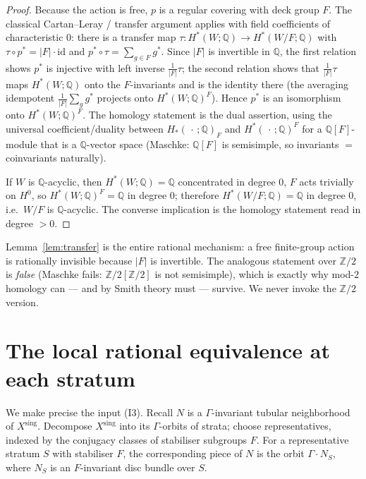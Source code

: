 \documentclass[12pt]{article}
\begin{document}
\begin{proof}
Because the action is free, $p$ is a regular covering with deck group $F$.
The classical Cartan--Leray / transfer argument applies with field
coefficients of characteristic $0$: there is a transfer map
$\tau:H^*(W;\mathbb{Q})\to H^*(W/F;\mathbb{Q})$ with
$\tau\circ p^*=|F|\cdot\mathrm{id}$ and $p^*\circ\tau=\sum_{g\in F}g^*$. Since
$|F|$ is invertible in $\mathbb{Q}$, the first relation shows $p^*$ is
injective with left inverse $\tfrac1{|F|}\tau$; the second relation shows that
$\tfrac1{|F|}\tau$ maps $H^*(W;\mathbb{Q})$ onto the $F$-invariants and is the
identity there (the averaging idempotent $\tfrac1{|F|}\sum_g g^*$ projects
onto $H^*(W;\mathbb{Q})^F$). Hence $p^*$ is an isomorphism onto
$H^*(W;\mathbb{Q})^F$. The homology statement is the dual assertion, using the
universal coefficient/duality between $H_*(\,\cdot\,;\mathbb{Q})_F$ and
$H^*(\,\cdot\,;\mathbb{Q})^F$ for a $\mathbb{Q}[F]$-module that is a
$\mathbb{Q}$-vector space (Maschke: $\mathbb{Q}[F]$ is semisimple, so
invariants $=$ coinvariants naturally).

If $W$ is $\mathbb{Q}$-acyclic, then $H^*(W;\mathbb{Q})=\mathbb{Q}$
concentrated in degree $0$, $F$ acts trivially on $H^0$, so
$H^*(W;\mathbb{Q})^F=\mathbb{Q}$ in degree $0$; therefore
$H^*(W/F;\mathbb{Q})=\mathbb{Q}$ in degree $0$, i.e.\ $W/F$ is
$\mathbb{Q}$-acyclic. The converse implication is the homology statement read
in degree $>0$.
\end{proof}

\begin{remark}\label{rem:smith}
Lemma~\ref{lem:transfer} is the entire rational mechanism: a free finite-group
action is rationally invisible because $|F|$ is invertible. The analogous
statement over $\mathbb{Z}/2$ is \emph{false} (Maschke fails: $\mathbb{Z}/2[\mathbb{Z}/2]$
is not semisimple), which is exactly why mod-$2$ homology can — and by Smith
theory must — survive. We never invoke the $\mathbb{Z}/2$ version.
\end{remark}

\section{The local rational equivalence at each stratum}\label{sec:local}

We make precise the input (I3). Recall $N$ is a $\Gamma$-invariant tubular
neighborhood of $X^{\mathrm{sing}}$. Decompose $X^{\mathrm{sing}}$ into its
$\Gamma$-orbits of strata; choose representatives, indexed by the conjugacy
classes of stabiliser subgroups $F$. For a representative stratum $S$ with
stabiliser $F$, the corresponding piece of $N$ is the orbit
$\Gamma\cdot N_S$, where $N_S$ is an $F$-invariant disc bundle over $S$.
\end{document}
